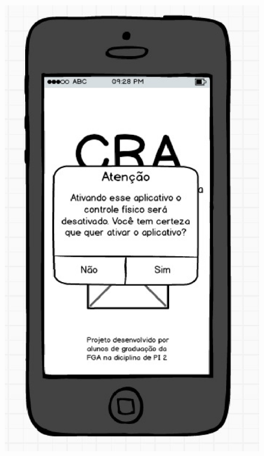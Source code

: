 \begin{figure}[!htb]
{  		\includegraphics[keepaspectratio=true,scale=0.6]{figuras/controle/tela_2}
		}
		\subfloat{
}
\end{figure}
